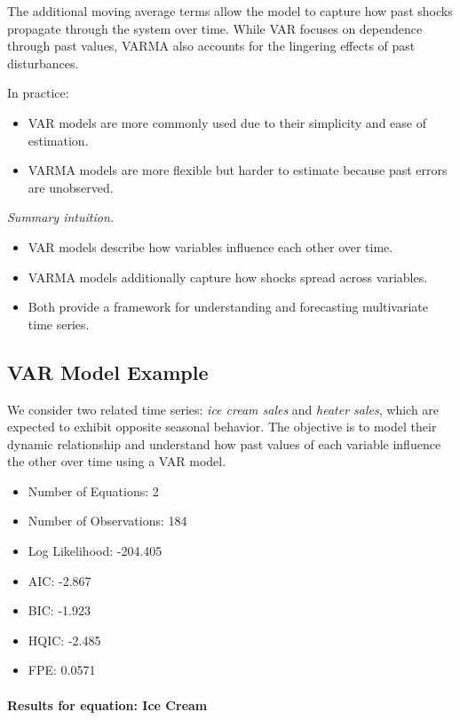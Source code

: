 \documentclass[10pt,a4paper]{article}
\begin{document}
	The additional moving average terms allow the model to capture how past shocks propagate through the system over time. While VAR focuses on dependence through past values, VARMA also accounts for the lingering effects of past disturbances.
	
	In practice:
	\begin{itemize}
	\item VAR models are more commonly used due to their simplicity and ease of estimation.
	\item VARMA models are more flexible but harder to estimate because past errors are unobserved.
	\end{itemize}
	
	\textit{Summary intuition.}
	\begin{itemize}
	\item VAR models describe how variables influence each other over time.
	\item VARMA models additionally capture how shocks spread across variables.
	\item Both provide a framework for understanding and forecasting multivariate time series.
	\end{itemize}
	
	
	\subsection{VAR Model Example}
	We consider two related time series: \textit{ice cream sales} and \textit{heater sales}, which are expected to exhibit opposite seasonal behavior. The objective is to model their dynamic relationship and understand how past values of each variable influence the other over time using a VAR model.
	\begin{itemize}
	\item Number of Equations: 2
	\item Number of Observations: 184
	\item Log Likelihood: -204.405
	\item AIC: -2.867
	\item BIC: -1.923
	\item HQIC: -2.485
	\item FPE: 0.0571
	\end{itemize}
	
	\paragraph{Results for equation: Ice Cream}
	
\end{document}
